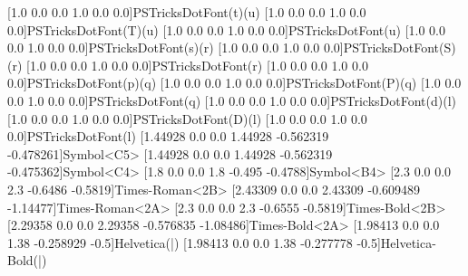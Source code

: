 [1.0 0.0 0.0 1.0 0.0 0.0]{PSTricksDotFont}{(t)}{(u)}
[1.0 0.0 0.0 1.0 0.0 0.0]{PSTricksDotFont}{(T)}{(u)}
[1.0 0.0 0.0 1.0 0.0 0.0]{PSTricksDotFont}{(u)}
[1.0 0.0 0.0 1.0 0.0 0.0]{PSTricksDotFont}{(s)}{(r)}
[1.0 0.0 0.0 1.0 0.0 0.0]{PSTricksDotFont}{(S)}{(r)}
[1.0 0.0 0.0 1.0 0.0 0.0]{PSTricksDotFont}{(r)}
[1.0 0.0 0.0 1.0 0.0 0.0]{PSTricksDotFont}{(p)}{(q)}
[1.0 0.0 0.0 1.0 0.0 0.0]{PSTricksDotFont}{(P)}{(q)}
[1.0 0.0 0.0 1.0 0.0 0.0]{PSTricksDotFont}{(q)}
[1.0 0.0 0.0 1.0 0.0 0.0]{PSTricksDotFont}{(d)}{(l)}
[1.0 0.0 0.0 1.0 0.0 0.0]{PSTricksDotFont}{(D)}{(l)}
[1.0 0.0 0.0 1.0 0.0 0.0]{PSTricksDotFont}{(l)}
[1.44928 0.0 0.0 1.44928 -0.562319 -0.478261]{Symbol}{<C5>}
[1.44928 0.0 0.0 1.44928 -0.562319 -0.475362]{Symbol}{<C4>}
[1.8 0.0 0.0 1.8 -0.495 -0.4788]{Symbol}{<B4>}
\newpsfontdot{+}[2.3 0.0 0.0 2.3 -0.6486 -0.5819]{Times-Roman}{<2B>}
[2.43309 0.0 0.0 2.43309 -0.609489 -1.14477]{Times-Roman}{<2A>}
[2.3 0.0 0.0 2.3 -0.6555 -0.5819]{Times-Bold}{<2B>}
[2.29358 0.0 0.0 2.29358 -0.576835 -1.08486]{Times-Bold}{<2A>}
\newpsfontdot{|}[1.98413 0.0 0.0 1.38 -0.258929 -0.5]{Helvetica}{(|)}
[1.98413 0.0 0.0 1.38 -0.277778 -0.5]{Helvetica-Bold}{(|)}%

